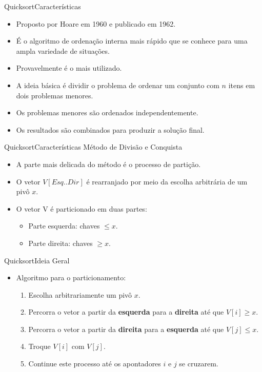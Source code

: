 \documentclass[aspectratio=169]{beamer}
\begin{document}
\begin{frame}{Quicksort}{Características}
\begin{itemize}
\item Proposto por Hoare em 1960 e publicado em 1962.
\item É o algoritmo de ordenação interna mais rápido que se conhece para uma ampla variedade de situações.
\item Provavelmente é o mais utilizado.
\item A ideia básica é dividir o problema de ordenar um conjunto com $n$ itens em dois problemas menores.
\item Os problemas menores são ordenados independentemente.
\item Os resultados são combinados para produzir a solução final.
\end{itemize}
\end{frame}


\begin{frame}{Quicksort}{Características}
Método de Divisão e Conquista
\begin{itemize}
\item  A parte mais delicada do método é o processo de partição.
\item O vetor $V[Esq..Dir]$ é rearranjado por meio da escolha arbitrária de um pivô $x$.
\item O vetor V é particionado em duas partes:
\begin{itemize}
\item Parte esquerda: chaves $\leq x$.
\item Parte direita: chaves $\geq x$.
\end{itemize}
\end{itemize}
\end{frame}



\begin{frame}{Quicksort}{Ideia Geral}
\begin{itemize}
\item Algoritmo para o particionamento:
\begin{enumerate}
\item Escolha arbitrariamente um pivô $x$.
\item Percorra o vetor a partir da {\bf esquerda} para a {\bf direita} até que $V[i] \geq x$.
\item Percorra o vetor a partir da {\bf direita} para a {\bf esquerda} até que $V[j] \leq x$.
\item Troque $V[i]$ com $V[j]$.
\item Continue este processo até os apontadores $i$ e $j$ se cruzarem.
\end{enumerate}
\end{itemize}
\end{frame}
\end{document}
